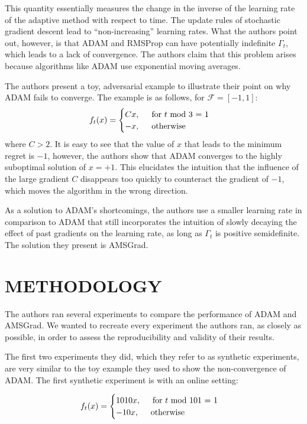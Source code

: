 \documentclass[letterpaper, 10 pt, conference]{ieeeconf}  %
\begin{document}
This quantity essentially measures the change in the inverse of the learning rate of the adaptive method with respect to time. The update rules of stochastic gradient descent lead to ``non-increasing'' learning rates. What the authors point out, however, is that ADAM and RMSProp can have potentially indefinite $\Gamma_{t}$, which leads to a lack of convergence. The authors claim that this problem arises because algorithms like ADAM use exponential moving averages. \par
The authors present a toy, adversarial example to illustrate their point on why ADAM fails to converge. The example is as follows, for $\mathcal{F} = [-1, 1]$:
\[
    f_{t}(x) = 
    \begin{cases}
     	Cx, \hspace{5mm} \text{for } t \text{ mod 3 = 1} \\
        -x, \hspace{5mm} \text{otherwise}
    \end{cases}
\]
where $C>2$. It is easy to see that the value of $x$ that leads to the minimum regret is $-1$, however, the authors show that ADAM converges to the highly suboptimal solution of $x = +1$. This elucidates the intuition that the influence of the large gradient $C$ disappears too quickly to counteract the gradient of $-1$, which moves the algorithm in the wrong direction. \par
As a solution to ADAM's shortcomings, the authors use a smaller learning rate in comparison to ADAM that still incorporates the intuition of slowly decaying the effect of past gradients on the learning rate, as long as $\Gamma_{t}$ is positive semidefinite. The solution they present is AMSGrad. 

\section{METHODOLOGY}
The authors ran several experiments to compare the performance of ADAM and AMSGrad. We wanted to recreate every experiment the authors ran, as closely as possible, in order to assess the reproducibility and validity of their results. 
\par The first two experiments they did, which they refer to as synthetic experiments, are very similar to the toy example they used to show the non-convergence of ADAM. The first synthetic experiment is with an online setting:

\[
    f_{t}(x) = 
    \begin{cases}
     	1010x, \hspace{5mm} \text{for } t \text{ mod 101 = 1} \\
        -10x, \hspace{5mm} \text{otherwise}
    \end{cases}
\]
\end{document}
